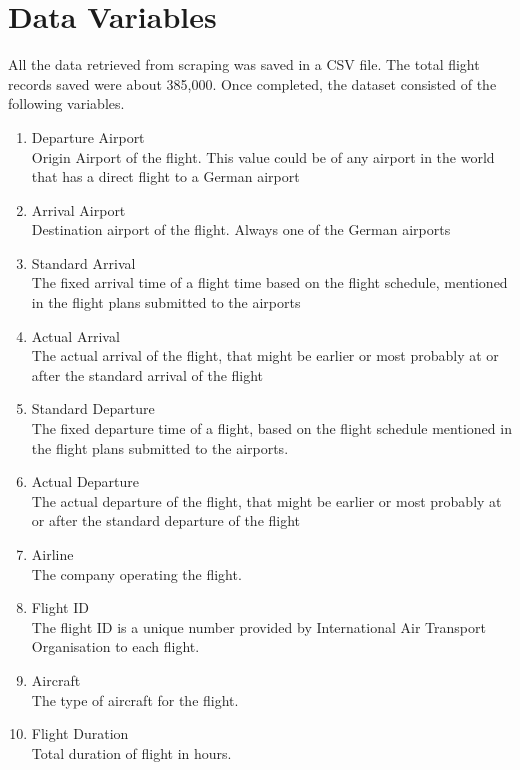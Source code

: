 \section{Data Variables}
All the data  retrieved from scraping was saved in a CSV file. The total flight records saved were about 385,000. Once completed, the dataset consisted of the following variables.
\begin{enumerate}
    \item {Departure Airport}
    \\Origin Airport of the flight. This value could be of any airport in the world that has a direct flight to a German airport
    \item {Arrival Airport}
    \\Destination airport of the flight. Always one of the German airports
    \item {Standard Arrival}
    \\The fixed arrival time of a flight time based on the flight schedule, mentioned in the flight plans submitted to the airports
    \item {Actual Arrival}
    \\The actual arrival of the flight, that might be earlier or most probably at or after the standard arrival of the flight
    \item {Standard Departure}
    \\The fixed departure time of a flight, based on the flight schedule mentioned in the flight plans submitted to the airports.
    \item {Actual Departure}
    \\The actual departure of the flight, that might be earlier or most probably at or after the standard departure of the flight
    \item {Airline}
    \\The company operating the flight.
    \item {Flight ID}
    \\The flight ID is a unique number provided by International Air Transport Organisation to each flight.
    \item {Aircraft}
    \\The type of aircraft for the flight.
    \item {Flight Duration}
    \\Total duration of flight in hours.
\end{enumerate}

